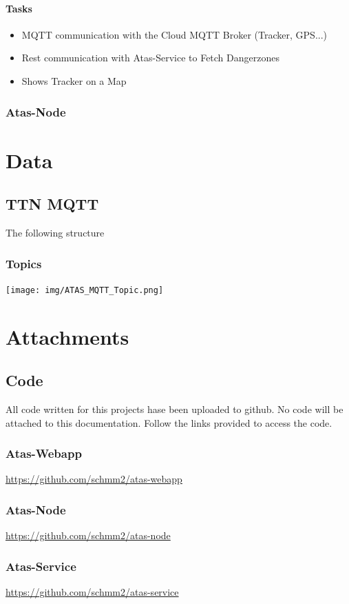 \documentclass[a4paper,11pt, oneside]{report}
\theoremstyle{definition}
\begin{document}
\subsubsection{Tasks}
\begin{itemize}
\item MQTT communication with the Cloud MQTT Broker (Tracker, GPS...)
\item Rest communication with Atas-Service to Fetch Dangerzones
\item Shows Tracker on a Map
\end{itemize}
  
\subsection{Atas-Node}  



\chapter{Data}
\section{TTN MQTT}
The following structure 
\subsection{Topics}
\texttt{[image: img/ATAS\_MQTT\_Topic.png]}\\[1cm]    


\chapter{Attachments}
\section{Code}
All code written for this projects hase been uploaded to github. No code will be attached to this documentation. Follow the links provided to access the code.
\subsection{Atas-Webapp}
\url{https://github.com/schmm2/atas-webapp}
\subsection{Atas-Node}
\url{https://github.com/schmm2/atas-node}
\subsection{Atas-Service}
\url{https://github.com/schmm2/atas-service}


\printglossaries
\end{document}
